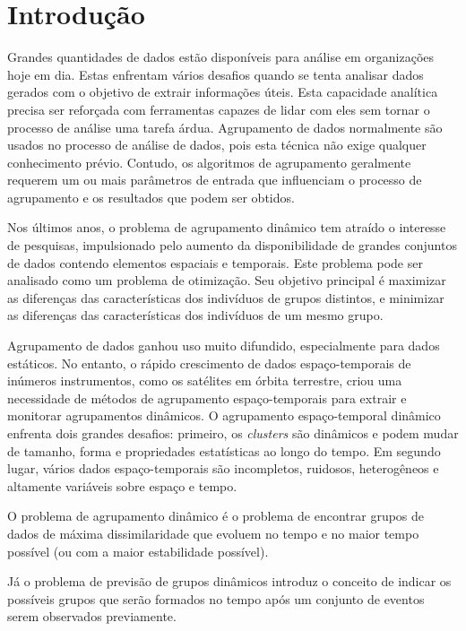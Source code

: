 \chapter{Introdução}
\label{cap:introducao}
Grandes quantidades de dados estão disponíveis para análise em organizações hoje em dia.
Estas enfrentam vários desafios quando se tenta analisar dados gerados com o objetivo de
extrair informações úteis.
Esta capacidade analítica precisa ser reforçada com ferramentas capazes de lidar com eles sem tornar o processo de análise uma tarefa árdua.
Agrupamento de dados normalmente são usados no processo de análise de dados, pois esta técnica
não exige qualquer conhecimento prévio. Contudo, os algoritmos de agrupamento
geralmente requerem um ou mais parâmetros de entrada que influenciam o processo de
agrupamento e os resultados que podem ser obtidos. 

Nos últimos anos, o problema de agrupamento dinâmico tem atraído o interesse de pesquisas,
impulsionado pelo aumento da disponibilidade de grandes conjuntos de dados contendo
elementos espaciais e temporais. Este problema pode ser analisado como um problema de
otimização. Seu objetivo principal é maximizar as diferenças das características dos
indivíduos de grupos distintos, e minimizar as diferenças das características dos
indivíduos de um mesmo grupo.


Agrupamento de dados ganhou uso muito difundido, especialmente para dados estáticos.
No entanto, o rápido crescimento de dados espaço-temporais de inúmeros instrumentos,
como os satélites em órbita terrestre, criou uma necessidade de métodos de agrupamento
espaço-temporais para extrair e monitorar agrupamentos dinâmicos. O agrupamento espaço-temporal
dinâmico enfrenta dois grandes desafios: primeiro, os \textit{clusters} são dinâmicos e podem mudar de
tamanho, forma e propriedades estatísticas ao longo do tempo. Em segundo lugar, vários dados
espaço-temporais são incompletos, ruidosos, heterogêneos e altamente variáveis sobre espaço e tempo.


O problema de agrupamento dinâmico é o problema de encontrar grupos de dados de máxima dissimilaridade que evoluem no tempo e no maior tempo possível (ou com a maior estabilidade possível).

Já o problema de previsão de grupos dinâmicos introduz o conceito de indicar os
possíveis grupos que serão formados no tempo após um conjunto de eventos serem
observados previamente.

